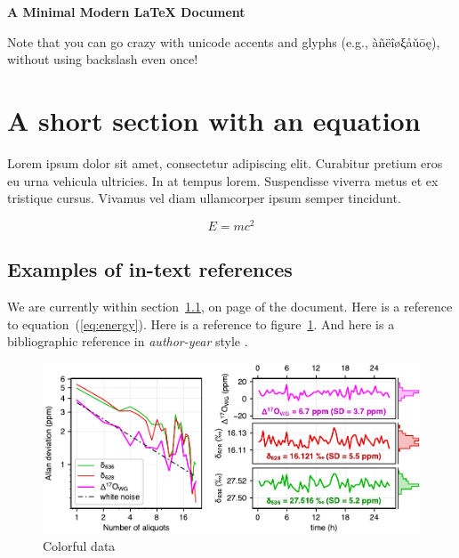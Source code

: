 \documentclass{article}
\begin{document}

\begin{center} %
	\LARGE\bfseries
	A Minimal Modern \LaTeX{} Document
\end{center}

\vspace{3ex} %

Note that you can go crazy with unicode accents and glyphs (e.g., àñëîøξåǔōę), without using backslash even once!

\section{A short section with an equation}

Lorem ipsum dolor sit amet, consectetur adipiscing elit. Curabitur pretium eros eu urna vehicula ultricies. In at tempus lorem. Suspendisse viverra metus et ex tristique cursus. Vivamus vel diam ullamcorper ipsum semper tincidunt.

\begin{equation} %
	E = mc^2
	\label{eq:energy} %
\end{equation}

\subsection{Examples of in-text references}
\label{sec:refs}

We are currently within section~\ref{sec:refs}, on page \pageref{sec:refs} of the document.
Here is a reference to equation~(\ref{eq:energy}).
Here is a reference to figure~\ref{fig:avar}.
And here is a bibliographic reference in \textit{author-year} style \parencite{Pesnin_2024}.


\begin{figure}[b!] %
	\includegraphics[width=\textwidth]{avar}
	\caption{Colorful data}
	\label{fig:avar} %
\end{figure}

\printbibliography %
\end{document}
